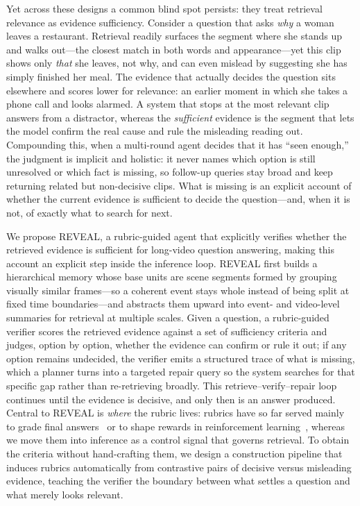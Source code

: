 \documentclass[letterpaper]{article} %
\begin{document}
Yet across these designs a common blind spot persists: they treat retrieval relevance as evidence sufficiency. Consider a question that asks \emph{why} a woman leaves a restaurant. Retrieval readily surfaces the segment where she stands up and walks out---the closest match in both words and appearance---yet this clip shows only \emph{that} she leaves, not why, and can even mislead by suggesting she has simply finished her meal. The evidence that actually decides the question sits elsewhere and scores lower for relevance: an earlier moment in which she takes a phone call and looks alarmed. A system that stops at the most relevant clip answers from a distractor, whereas the \emph{sufficient} evidence is the segment that lets the model confirm the real cause and rule the misleading reading out. Compounding this, when a multi-round agent decides that it has ``seen enough,'' the judgment is implicit and holistic: it never names which option is still unresolved or which fact is missing, so follow-up queries stay broad and keep returning related but non-decisive clips. What is missing is an explicit account of whether the current evidence is sufficient to decide the question---and, when it is not, of exactly what to search for next.

We propose REVEAL, a rubric-guided agent that explicitly verifies whether the retrieved evidence is sufficient for long-video question answering, making this account an explicit step inside the inference loop. REVEAL first builds a hierarchical memory whose base units are scene segments formed by grouping visually similar frames---so a coherent event stays whole instead of being split at fixed time boundaries---and abstracts them upward into event- and video-level summaries for retrieval at multiple scales. Given a question, a rubric-guided verifier scores the retrieved evidence against a set of sufficiency criteria and judges, option by option, whether the evidence can confirm or rule it out; if any option remains undecided, the verifier emits a structured trace of what is missing, which a planner turns into a targeted repair query so the system searches for that specific gap rather than re-retrieving broadly. This retrieve--verify--repair loop continues until the evidence is decisive, and only then is an answer produced. Central to REVEAL is \emph{where} the rubric lives: rubrics have so far served mainly to grade final answers~\citep{liu2023geval,zheng2023judging,kim2023prometheus,es2023ragas} or to shape rewards in reinforcement learning~\citep{liu2025openrubrics,zhou2025ruscarl,zhang2026chasingtail}, whereas we move them into inference as a control signal that governs retrieval. To obtain the criteria without hand-crafting them, we design a construction pipeline that induces rubrics automatically from contrastive pairs of decisive versus misleading evidence, teaching the verifier the boundary between what settles a question and what merely looks relevant.
\end{document}
